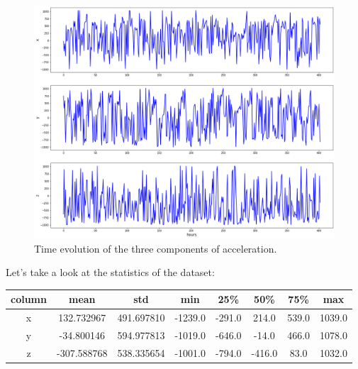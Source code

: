 \begin{figure}[H]
\centering
  \includegraphics[scale=0.3]{img/task_1/data(hour).png}
  \caption{Time evolution of the three components of acceleration.}
  \label{fig: time evolution acc task 1}
\end{figure}

Let's take a look at the statistics of the dataset:

\begin{center}
\begin{tabular}{| c | c | c | c | c | c | c | c |} 
\hline
column & mean & std & min & 25\% & 50\% & 75\% & max \\ [0.5ex] 
\hline
\hline
x & 132.732967 & 491.697810 & -1239.0 & -291.0 & 214.0 & 539.0 & 1039.0 \\
\hline
y & -34.800146 & 594.977813 & -1019.0 & -646.0 & -14.0 & 466.0 & 1078.0 \\
\hline
z & -307.588768 & 538.335654 & -1001.0 & -794.0 & -416.0 & 83.0 & 1032.0 \\ [1ex]
\hline
\end{tabular}
\end{center}


